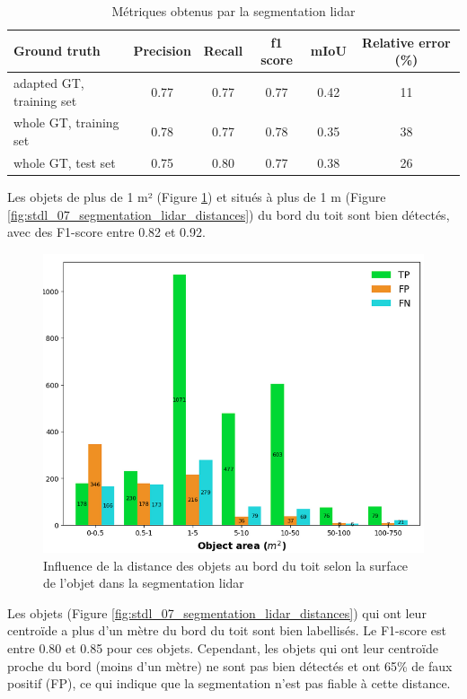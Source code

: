 {{{\begin{table}[H]
    \centering
    \begin{tabular}{|l|c|c|c|c|c|}
    \hline
    Ground truth & Precision & Recall & f1 score & mIoU & Relative error (\%) \\
    \hline
    adapted GT, training set & 0.77 & 0.77 & 0.77 & 0.42 & 11 \\
    whole GT, training set & 0.78 & 0.77 & 0.78 & 0.35 & 38 \\
    whole GT, test set & 0.75 & 0.80 & 0.77 & 0.38 & 26 \\
    \hline
    \end{tabular}
    \caption{Métriques obtenus par la segmentation \gls{lidar}}
    \label{tab:stdl_02_resultats_segmentation_lidar}
\end{table}

\par{Les objets de plus de 1 m² (Figure \ref{fig:stdl_06_segmentation_lidar_surfaces}) et situés à plus de 1 m (Figure \ref{fig:stdl_07_segmentation_lidar_distances}) du bord du toit sont bien détectés, avec des F1-score entre 0.82 et 0.92.
\begin{figure}[H]
    \centering
    \includegraphics[width=1\linewidth]{02-main//figures/stdl_06_segmentation_lidar_surfaces.png}
    \caption{Influence de la distance des objets au bord du toit selon la surface de l’objet dans la segmentation \gls{lidar} \cite{herny_detection_2024}}
    \label{fig:stdl_06_segmentation_lidar_surfaces}
\end{figure}
\newpage
\par{Les objets (Figure \ref{fig:stdl_07_segmentation_lidar_distances}) qui ont leur centroïde a plus d'un mètre du bord du toit sont bien labellisés. Le F1-score est entre 0.80 et 0.85 pour ces objets. Cependant, les objets qui ont leur centroïde proche du bord (moins d'un mètre) ne sont pas bien détectés et ont 65\% de faux positif (FP), ce qui indique que la segmentation n'est pas fiable à cette distance.}

}}}}
